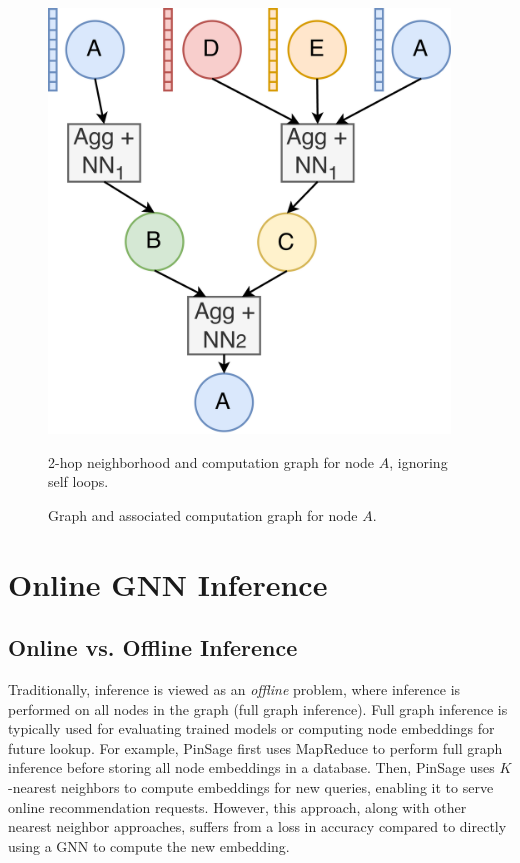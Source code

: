 \begin{figure}[h!]
\begin{minipage}[c]{0.45\textwidth}
        \includegraphics[width=0.95\textwidth]{diagrams/group_meeting_gnn-GNN Execution.png}
        \caption{2-hop neighborhood and computation graph for node $A$, ignoring self loops.}
    \end{minipage}
    \caption{Graph and associated computation graph for node $A$.}
    \label{Background: GNN Execution Example}
\end{figure}    

\section{Online GNN Inference}

\subsection{Online vs. Offline Inference}
Traditionally, inference is viewed as an \textit{offline} problem, where inference is performed on all nodes in the graph (full graph inference).
Full graph inference is typically used for evaluating trained models or computing node embeddings for future lookup. 
For example, PinSage \cite{Recsys_PinSAGE_2018} first uses MapReduce \cite{MapReduce_2004} to perform full graph inference before storing all node embeddings in a database.
Then, PinSage uses $K$-nearest neighbors to compute embeddings for new queries, enabling it to serve online recommendation requests.
However, this approach, along with other nearest neighbor approaches, suffers from a loss in accuracy compared to directly using a GNN to compute the new embedding.

